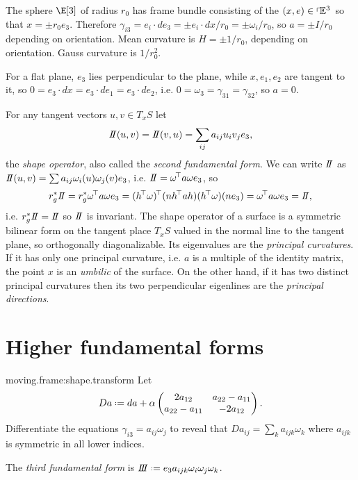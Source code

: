 \begin{example} 
The sphere \(\E[3]\) of radius \(r_0\) has frame bundle consisting of the \((x,e) \in \left\ulcorner\!\mathbb{E}^{3}\right.\) so that \(x=\pm r_0 e_3\).
Therefore \(\gamma_{i3} = e_i \cdot de_3=\pm e_i \cdot dx/r_0 = \pm \omega_i/r_0\), so \(a=\pm I/r_0\) depending on orientation.
Mean curvature is \(H=\pm 1/r_0\), depending on orientation.
Gauss curvature is \(1/r_0^2\).
\end{example}
\begin{example}
For a flat plane, \(e_3\) lies perpendicular to the plane, while \(x, e_1, e_2\) are tangent to it, so \(0=e_3 \cdot dx = e_3 \cdot de_1 = e_3 \cdot de_2\), i.e. \(0=\omega_3=\gamma_{31} = \gamma_{32}\), so \(a=0\).
\end{example}
For any tangent vectors \(u,v \in T_x S\) let 
\[
\shapeOp(u,v)=\shapeOp(v,u)=\sum_{ij} a_{ij} u_i v_j e_3,
\]
the \emph{shape operator}, also called the \emph{second fundamental form}.
We can write \(\shapeOp\) as \(\shapeOp(u,v)=\sum a_{ij} \omega_i(u) \omega_j(v)e_3\), i.e. \(\shapeOp=\transpose{\omega} a \omega e_3\), so 
\[
r_g^* \shapeOp = r_g^* \transpose{\omega} a \omega e_3 = \transpose{(\transpose{h}\omega)}(n \transpose{h} a h) (\transpose{h} \omega) (ne_3) = \transpose{\omega} a\omega e_3 = \shapeOp,
\]
i.e. \(r_g^* \shapeOp = \shapeOp\) so \(\shapeOp\) is invariant.
The shape operator of a surface is a symmetric bilinear form on the tangent place \(T_x S\) valued in the normal line to the tangent plane, so orthogonally diagonalizable.
Its eigenvalues are the \emph{principal curvatures}.
If it has only one principal curvature, i.e. \(a\) is a multiple of the identity matrix, the point \(x\) is an \emph{umbilic} of the surface.
On the other hand, if it has two distinct principal curvatures then its two perpendicular eigenlines are the \emph{principal directions}.

\section{Higher fundamental forms}
\begin{problem}{moving.frame:shape.transform}
Let
\[
Da\defeq
da
+
\alpha
\begin{pmatrix}
2 a_{12} & a_{22}-a_{11}\\
a_{22}-a_{11} & -2a_{12}
\end{pmatrix}.
\]
Differentiate the equations \(\gamma_{i3}=a_{ij}\omega_j\) to reveal that \(Da_{ij}=\sum_k a_{ijk}\omega_k\) where \(a_{ijk}\) is symmetric in all lower indices.
\end{problem}
The \emph{third fundamental form} is
\(\thirdFundForm\defeq e_3 a_{ijk} \omega_i\omega_j\omega_k\).

